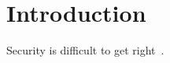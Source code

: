\section{Introduction}

Security is difficult to get right~\cite{kohlbrenner-shacham:fuzzyfox:usec16,kocher:timing-attacks:c96}.

\lipsum[2-10]
